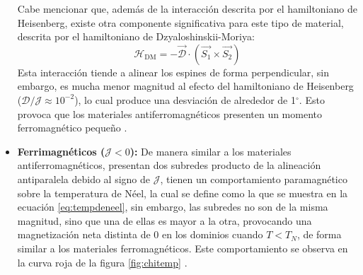 \documentclass[../main.tex]{subfiles}
\begin{document}
\begin{itemize}
    Cabe mencionar que, además de la interacción descrita por el hamiltoniano de Heisenberg, existe otra componente significativa para este tipo de material, descrita por el hamiltoniano de Dzyaloshinskii-Moriya:
    \begin{equation}
        \mathcal{H}_\text{DM}=-\vec{\mathcal{D}}\cdot\left(\vec{S_1}\times\vec{S_2}\right)
        \label{eq:hamiltonianoDM}
    \end{equation}
    Esta interacción tiende a alinear los espines de forma perpendicular, sin embargo, es mucha menor magnitud al efecto del hamiltoniano de Heisenberg ($\mathcal{D}/\mathcal{J}\approx10^{-2}$), lo cual produce una desviación de alrededor de 1$^\circ$. Esto provoca que los materiales antiferromagnéticos presenten un momento ferromagnético pequeño \cite{coey2010magnetism}.
    \item \textbf{Ferrimagnéticos ($\mathcal{J}<0$):} De manera similar a los materiales antiferromagnéticos, presentan dos subredes producto de la alineación antiparalela debido al signo de $\mathcal{J}$, tienen un comportamiento paramagnético sobre la temperatura de Néel, la cual se define como la que se muestra en la ecuación \ref{eq:tempdeneel}, sin embargo, las subredes no son de la misma magnitud, sino que una de ellas es mayor a la otra, provocando una magnetización neta distinta de 0 en los dominios cuando $T<T_N$, de forma similar a los materiales ferromagnéticos. Este comportamiento se observa en la curva roja de la figura \ref{fig:chitemp} \cite{coey2010magnetism}.
\end{itemize}
\end{document}
